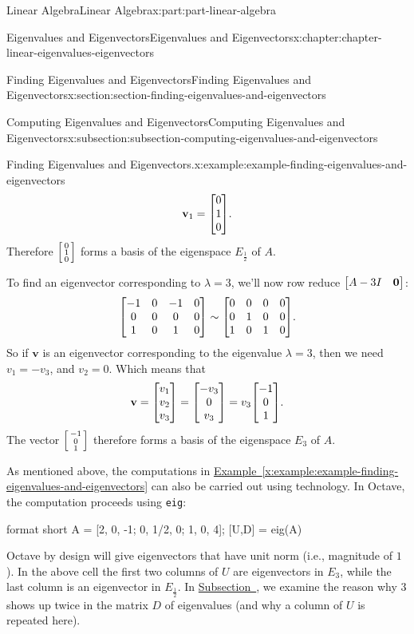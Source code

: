 \documentclass[twoside,10pt,]{book}
\newcommand{\xreffont}{\relax}
\newcommand{\mono}[1]{\texttt{#1}}
\numberwithin{equation}{part}
\providecommand{\vb}[1]{\mathbf{#1}}
\begin{document}
\begin{partptx}{Linear Algebra}{}{Linear Algebra}{}{}{x:part:part-linear-algebra}
\begin{chapterptx}{Eigenvalues and Eigenvectors}{}{Eigenvalues and Eigenvectors}{}{}{x:chapter:chapter-linear-eigenvalues-eigenvectors}
\begin{sectionptx}{Finding Eigenvalues and Eigenvectors}{}{Finding Eigenvalues and Eigenvectors}{}{}{x:section:section-finding-eigenvalues-and-eigenvectors}
\begin{subsectionptx}{Computing Eigenvalues and Eigenvectors}{}{Computing Eigenvalues and Eigenvectors}{}{}{x:subsection:subsection-computing-eigenvalues-and-eigenvectors}
\begin{example}{Finding Eigenvalues and Eigenvectors.}{x:example:example-finding-eigenvalues-and-eigenvectors}
\begin{equation*}
\vb{v}_{1} = \mqty[0\\1\\0].
\end{equation*}
Therefore \(\smqty[0\\1\\0]\) forms a basis of the eigenspace \(E_{\frac{1}{2}}\) of \(A\).%
\par
To find an eigenvector corresponding to \(\lambda = 3\), we'll now row reduce \(\mqty[A - 3I & \vb{0}]\):%
\begin{equation*}
\mqty[-1 & 0 & -1 & 0 \\ 0 & 0 & 0 & 0 \\ 1 & 0 & 1 & 0]\sim\mqty[0 & 0 & 0 & 0 \\ 0 & 1 & 0 & 0 \\ 1 & 0 & 1 & 0].
\end{equation*}
So if \(\vb{v}\) is an eigenvector corresponding to the eigenvalue \(\lambda=3\), then we need \(v_{1} = -v_{3}\), and \(v_{2} = 0\). Which means that%
\begin{equation*}
\vb{v} = \mqty[\xmat*{v}{3}{1}] = \mqty[-v_{3} \\ 0 \\ v_{3}] = v_{3}\mqty[-1\\0\\1].
\end{equation*}
The vector \(\smqty[-1\\0\\1]\) therefore forms a basis of the eigenspace \(E_3\) of \(A\).%
\end{example}
As mentioned above, the computations in \hyperref[x:example:example-finding-eigenvalues-and-eigenvectors]{Example~{\xreffont\ref{x:example:example-finding-eigenvalues-and-eigenvectors}}} can also be carried out using technology. In Octave, the computation proceeds using \mono{eig}:%
\begin{sageinput}
format short
A = [2, 0, -1; 0, 1/2, 0; 1, 0, 4];
[U,D] = eig(A)
\end{sageinput}
Octave by design will give eigenvectors that have unit norm (i.e., magnitude of \(1\)). In the above cell the first two columns of \(U\) are eigenvectors in \(E_3\), while the last column is an eigenvector in \(E_{\frac{1}{2}}\). In \hyperref[x:subsection:subsection-algebraic-and-geometric-multiplicities-of-eigenvalues]{Subsection~}, we examine the reason why \(3\) shows up twice in the matrix \(D\) of eigenvalues (and why a column of \(U\) is repeated here).%
\par

\end{subsectionptx}
\end{sectionptx}
\end{chapterptx}
\end{partptx}
\end{document}
